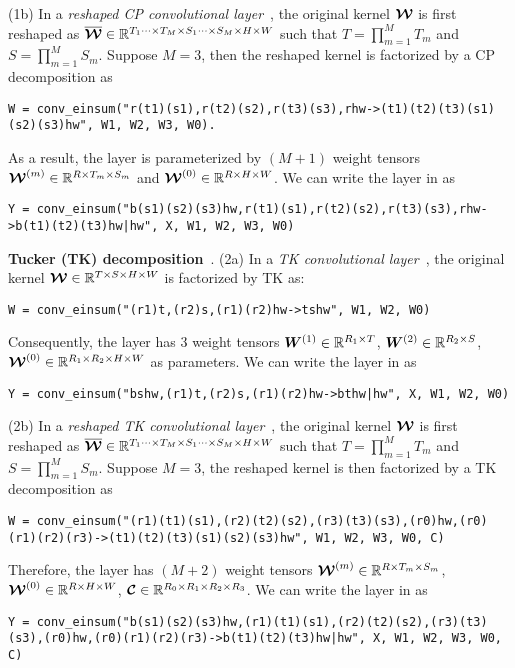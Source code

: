 (1b) In a {\em reshaped CP convolutional layer}~\citep{su2018tensorial}, the original kernel $\bm{\mathcal{W}}$ is first reshaped as $\bm{\mathcal{\overline{W}}} \in \mathbb{R}^{T_1 \cdots \times T_M \times S_1 \cdots \times S_M \times H \times W}$ such that $T = \prod_{m = 1}^{M} T_m$ and $S = \prod_{m = 1}^{M} S_m$. Suppose $M = 3$, then the reshaped kernel is factorized by a CP decomposition as
\begin{lstlisting}
W = conv_einsum("r(t1)(s1),r(t2)(s2),r(t3)(s3),rhw->(t1)(t2)(t3)(s1)(s2)(s3)hw", W1, W2, W3, W0).
\end{lstlisting}
\vspace{-0.5em}
As a result, the layer is parameterized by $(M + 1)$ weight tensors $\bm{\mathcal{W}}^{(m)} \in \mathbb{R}^{R \times T_m \times S_m}$ and $\bm{\mathcal{W}}^{(0)} \in \mathbb{R}^{R \times H \times W}$. We can write the layer in \conveinsum as
\begin{lstlisting}
Y = conv_einsum("b(s1)(s2)(s3)hw,r(t1)(s1),r(t2)(s2),r(t3)(s3),rhw->b(t1)(t2)(t3)hw|hw", X, W1, W2, W3, W0)
\end{lstlisting}

\textbf{Tucker (TK) decomposition}~\citep{kolda2009tensor}.
(2a) In a {\em TK convolutional layer}~\citep{lebedev2015speeding}, the original kernel $\bm{\mathcal{W}} \in \mathbb{R}^{T \times S \times H \times W}$ is factorized by TK as:
\begin{lstlisting}
W = conv_einsum("(r1)t,(r2)s,(r1)(r2)hw->tshw", W1, W2, W0)
\end{lstlisting}
\vspace{-0.5em}
Consequently, the layer has $3$ weight tensors $\bm{W}^{(1)} \in \mathbb{R}^{R_1 \times T}$, $\bm{W}^{(2)} \in \mathbb{R}^{R_2 \times S}$, $\bm{\mathcal{W}}^{(0)} \in \mathbb{R}^{R_1 \times R_2 \times H \times W}$ as parameters. We can write the layer in \conveinsum as
\begin{lstlisting}
Y = conv_einsum("bshw,(r1)t,(r2)s,(r1)(r2)hw->bthw|hw", X, W1, W2, W0)
\end{lstlisting}
\vspace{-0.5em}

(2b) In a {\em reshaped TK convolutional layer}~\citep{su2018tensorial}, the original kernel $\bm{\mathcal{W}}$ is first reshaped as $\bm{\mathcal{\overline{W}}} \in \mathbb{R}^{T_1 \cdots \times T_M \times S_1 \cdots \times S_M \times H \times W}$ such that $T = \prod_{m = 1}^{M} T_m$ and $S = \prod_{m = 1}^{M} S_m$. Suppose $M = 3$, the reshaped kernel is then factorized by a TK decomposition as
\begin{lstlisting}
W = conv_einsum("(r1)(t1)(s1),(r2)(t2)(s2),(r3)(t3)(s3),(r0)hw,(r0)(r1)(r2)(r3)->(t1)(t2)(t3)(s1)(s2)(s3)hw", W1, W2, W3, W0, C)
\end{lstlisting}
\vspace{-0.5em}
Therefore, the layer has $(M + 2)$ weight tensors $\bm{\mathcal{W}}^{(m)} \in \mathbb{R}^{R \times T_m \times S_m}$, $\bm{\mathcal{W}}^{(0)} \in \mathbb{R}^{R \times H \times W}$, $\bm{\mathcal{C}} \in \mathbb{R}^{R_0 \times R_1 \times R_2 \times R_3}$. We can write the layer in \conveinsum as
\begin{lstlisting}
Y = conv_einsum("b(s1)(s2)(s3)hw,(r1)(t1)(s1),(r2)(t2)(s2),(r3)(t3)(s3),(r0)hw,(r0)(r1)(r2)(r3)->b(t1)(t2)(t3)hw|hw", X, W1, W2, W3, W0, C)
\end{lstlisting}

